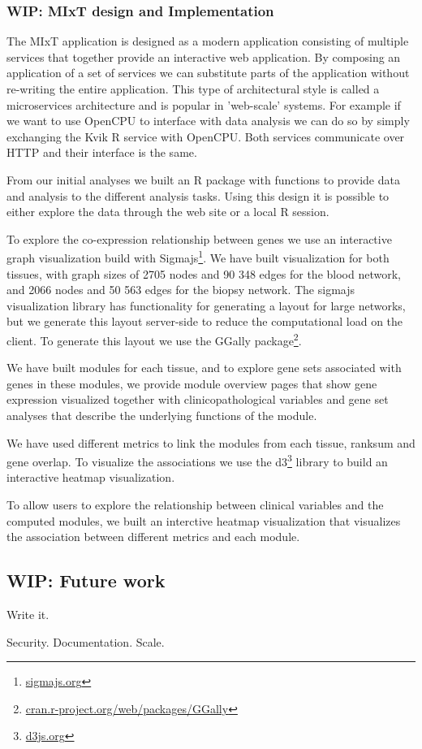 \subsubsection*{WIP: MIxT design and Implementation}
The MIxT application is designed as a modern application consisting of multiple
services that together provide an interactive web application. By composing an
application of a set of services we can substitute parts of the application
without re-writing the entire application. This type of architectural style is
called a microservices architecture and is popular in 'web-scale' systems. For
example if we want to use OpenCPU to interface with data analysis we can do so
by simply exchanging the Kvik R service with OpenCPU. Both services communicate
over HTTP and their interface is the same. 

From our initial analyses we built
an R package with functions to provide data and analysis to the different
analysis tasks. Using this design it is possible to either explore the data
through the web site or a local R session. 

To explore the co-expression relationship between genes we use an interactive
graph visualization build with Sigmajs\footnote{\url{sigmajs.org}}. We have
built visualization for both tissues, with graph sizes of 2705 nodes and 90 348
edges for the blood network, and 2066 nodes and 50 563 edges for the biopsy
network. The sigmajs visualization library has functionality for generating a
layout for large networks, but we generate this layout server-side to reduce the
computational load on the client. To generate this layout we use the GGally
package\footnote{\url{cran.r-project.org/web/packages/GGally}}. 

We have built modules for each tissue, and to explore gene sets associated with
genes in these modules, we provide module overview pages that show gene
expression visualized together with clinicopathological variables and gene set
analyses that describe the underlying functions of the module. 

We have used different metrics to link the modules from each tissue, ranksum and
gene overlap. To visualize the associations we use the
d3\footnote{\url{d3js.org}} library to build an interactive heatmap
visualization. 

To allow users to explore the relationship between clinical variables and the
computed modules, we built an interctive heatmap visualization that visualizes
the association between different metrics and each module. 


\subsection*{WIP: Future work} 
Write it.

Security.
Documentation.
Scale. 
